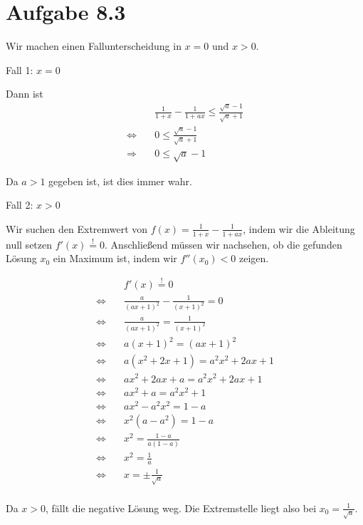 \documentclass[a4paper,german,12pt,smallheadings]{scrartcl}
\begin{document}
\section*{Aufgabe 8.3}

Wir machen einen Fallunterscheidung in $x = 0$ und $x > 0$.

Fall 1: $x=0$

Dann ist
\begin{align*}
  &\frac{1}{1+x} - \frac{1}{1+ax} \leq \frac{\sqrt{a} - 1}{\sqrt{a} + 1} \\
  \Leftrightarrow\quad& 0 \leq \frac{\sqrt{a} - 1}{\sqrt{a} + 1} \\
  \Rightarrow\quad&     0 \leq \sqrt{a} - 1
\end{align*}

Da $a > 1$ gegeben ist, ist dies immer wahr.

Fall 2: $x > 0$

Wir suchen den Extremwert von $f(x) = \frac{1}{1+x} - \frac{1}{1+ax}$, indem
wir die Ableitung null setzen $f'(x) \overset{!}{=} 0$. Anschließend müssen wir
nachsehen, ob die gefunden Lösung $x_0$ ein Maximum ist, indem wir $f''(x_0) <
0$ zeigen.

\begin{align*}
  &f'(x) \overset{!}{=} 0 \\
  \Leftrightarrow\quad& \frac{a}{(ax+1)^2} - \frac{1}{(x+1)^2} = 0 \\
  \Leftrightarrow\quad& \frac{a}{(ax+1)^2} = \frac{1}{(x+1)^2} \\
  \Leftrightarrow\quad& a(x+1)^2 = (ax+1)^2 \\
  \Leftrightarrow\quad& a(x^2+2x+1) = a^2x^2+2ax+1 \\
  \Leftrightarrow\quad& ax^2+2ax+a = a^2x^2+2ax+1 \\
  \Leftrightarrow\quad& ax^2+a = a^2x^2+1 \\
  \Leftrightarrow\quad& ax^2-a^2x^2 = 1-a \\
  \Leftrightarrow\quad& x^2(a-a^2) = 1-a \\
  \Leftrightarrow\quad& x^2 = \frac{1-a}{a(1-a)} \\
  \Leftrightarrow\quad& x^2 = \frac{1}{a} \\
  \Leftrightarrow\quad& x = \pm \frac{1}{\sqrt{a}} \\
\end{align*}

Da $x > 0$, fällt die negative Lösung weg. Die Extremstelle liegt also bei $x_0
= \frac{1}{\sqrt{a}}$.
\end{document}
